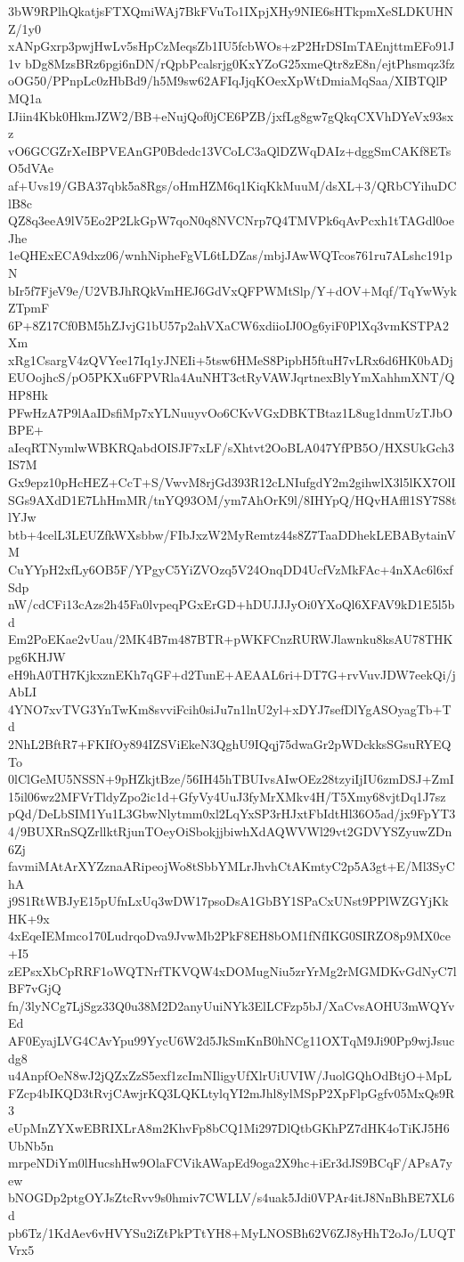 3bW9RPlhQkatjsFTXQmiWAj7BkFVuTo1IXpjXHy9NIE6sHTkpmXeSLDKUHNZ/1y0
xANpGxrp3pwjHwLv5sHpCzMeqsZb1IU5fcbWOs+zP2HrDSImTAEnjttmEFo91J1v
bDg8MzsBRz6pgi6nDN/rQpbPcalsrjg0KxYZoG25xmeQtr8zE8n/ejtPhsmqz3fz
oOG50/PPnpLc0zHbBd9/h5M9sw62AFIqJjqKOexXpWtDmiaMqSaa/XIBTQlPMQ1a
IJiin4Kbk0HkmJZW2/BB+eNujQof0jCE6PZB/jxfLg8gw7gQkqCXVhDYeVx93sxz
vO6GCGZrXeIBPVEAnGP0Bdedc13VCoLC3aQlDZWqDAIz+dggSmCAKf8ETsO5dVAe
af+Uvs19/GBA37qbk5a8Rgs/oHmHZM6q1KiqKkMuuM/dsXL+3/QRbCYihuDClB8c
QZ8q3eeA9lV5Eo2P2LkGpW7qoN0q8NVCNrp7Q4TMVPk6qAvPcxh1tTAGdl0oeJhe
1eQHExECA9dxz06/wnhNipheFgVL6tLDZas/mbjJAwWQTcos761ru7ALshc191pN
bIr5f7FjeV9e/U2VBJhRQkVmHEJ6GdVxQFPWMtSlp/Y+dOV+Mqf/TqYwWykZTpmF
6P+8Z17Cf0BM5hZJvjG1bU57p2ahVXaCW6xdiioIJ0Og6yiF0PlXq3vmKSTPA2Xm
xRg1CsargV4zQVYee17Iq1yJNEIi+5tsw6HMeS8PipbH5ftuH7vLRx6d6HK0bADj
EUOojhcS/pO5PKXu6FPVRla4AuNHT3ctRyVAWJqrtnexBlyYmXahhmXNT/QHP8Hk
PFwHzA7P9lAaIDsfiMp7xYLNuuyvOo6CKvVGxDBKTBtaz1L8ug1dnmUzTJbOBPE+
aIeqRTNymlwWBKRQabdOISJF7xLF/sXhtvt2OoBLA047YfPB5O/HXSUkGch3IS7M
Gx9epz10pHcHEZ+CcT+S/VwvM8rjGd393R12cLNIufgdY2m2gihwlX3l5lKX7OlI
SGs9AXdD1E7LhHmMR/tnYQ93OM/ym7AhOrK9l/8IHYpQ/HQvHAffl1SY7S8tlYJw
btb+4celL3LEUZfkWXsbbw/FIbJxzW2MyRemtz44s8Z7TaaDDhekLEBABytainVM
CuYYpH2xfLy6OB5F/YPgyC5YiZVOzq5V24OnqDD4UcfVzMkFAc+4nXAc6l6xfSdp
nW/cdCFi13cAzs2h45Fa0lvpeqPGxErGD+hDUJJJyOi0YXoQl6XFAV9kD1E5l5bd
Em2PoEKae2vUau/2MK4B7m487BTR+pWKFCnzRURWJlawnku8ksAU78THKpg6KHJW
eH9hA0TH7KjkxznEKh7qGF+d2TunE+AEAAL6ri+DT7G+rvVuvJDW7eekQi/jAbLI
4YNO7xvTVG3YnTwKm8svviFcih0siJu7n1lnU2yl+xDYJ7sefDlYgASOyagTb+Td
2NhL2BftR7+FKIfOy894IZSViEkeN3QghU9IQqj75dwaGr2pWDckksSGsuRYEQTo
0lClGeMU5NSSN+9pHZkjtBze/56IH45hTBUIvsAIwOEz28tzyiIjIU6zmDSJ+ZmI
15il06wz2MFVrTldyZpo2ic1d+GfyVy4UuJ3fyMrXMkv4H/T5Xmy68vjtDq1J7sz
pQd/DeLbSIM1Yu1L3GbwNlytmm0xl2LqYxSP3rHJxtFbIdtHl36O5ad/jx9FpYT3
4/9BUXRnSQZrllktRjunTOeyOiSbokjjbiwhXdAQWVWl29vt2GDVYSZyuwZDn6Zj
favmiMAtArXYZznaARipeojWo8tSbbYMLrJhvhCtAKmtyC2p5A3gt+E/Ml3SyChA
j9S1RtWBJyE15pUfnLxUq3wDW17psoDsA1GbBY1SPaCxUNst9PPlWZGYjKkHK+9x
4xEqeIEMmco170LudrqoDva9JvwMb2PkF8EH8bOM1fNfIKG0SIRZO8p9MX0ce+I5
zEPsxXbCpRRF1oWQTNrfTKVQW4xDOMugNiu5zrYrMg2rMGMDKvGdNyC7lBF7vGjQ
fn/3lyNCg7LjSgz33Q0u38M2D2anyUuiNYk3ElLCFzp5bJ/XaCvsAOHU3mWQYvEd
AF0EyajLVG4CAvYpu99YycU6W2d5JkSmKnB0hNCg11OXTqM9Ji90Pp9wjJsucdg8
u4AnpfOeN8wJ2jQZxZzS5exf1zcImNIligyUfXlrUiUVIW/JuolGQhOdBtjO+MpL
FZcp4bIKQD3tRvjCAwjrKQ3LQKLtylqYI2mJhl8ylMSpP2XpFlpGgfv05MxQs9R3
eUpMnZYXwEBRIXLrA8m2KhvFp8bCQ1Mi297DlQtbGKhPZ7dHK4oTiKJ5H6UbNb5n
mrpeNDiYm0lHucshHw9OlaFCVikAWapEd9oga2X9hc+iEr3dJS9BCqF/APsA7yew
bNOGDp2ptgOYJsZtcRvv9s0hmiv7CWLLV/s4uak5Jdi0VPAr4itJ8NnBhBE7XL6d
pb6Tz/1KdAev6vHVYSu2iZtPkPTtYH8+MyLNOSBh62V6ZJ8yHhT2oJo/LUQTVrx5
